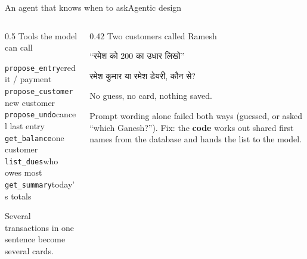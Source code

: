 \documentclass[aspectratio=169,10pt]{beamer}
\newcommand{\lbl}[1]{{\color{muted}\footnotesize #1}}
\begin{document}
\begin{frame}{An agent that knows when to ask}{Agentic design}
  \begin{columns}[T]
    \begin{column}{0.5\textwidth}
      \lbl{Tools the model can call}\par\vspace{4pt}
      \begin{appcard}
        \small
        \texttt{propose\_entry}\hfill{\color{muted}credit / payment}\\
        \texttt{propose\_customer}\hfill{\color{muted}new customer}\\
        \texttt{propose\_undo}\hfill{\color{muted}cancel last entry}\\
        \texttt{get\_balance}\hfill{\color{muted}one customer}\\
        \texttt{list\_dues}\hfill{\color{muted}who owes most}\\
        \texttt{get\_summary}\hfill{\color{muted}today's totals}
      \end{appcard}
      {\footnotesize\color{muted} Several transactions in one sentence become several cards.}
    \end{column}
    \begin{column}{0.42\textwidth}
      \lbl{Two customers called Ramesh}\par\vspace{4pt}
      \begin{appcard}
        {\deva “रमेश को 200 का उधार लिखो”}\par\vspace{6pt}
        {\semibold\deva रमेश कुमार या रमेश डेयरी, कौन से?}\par\vspace{6pt}
        {\footnotesize\color{muted} No guess, no card, nothing saved.}
      \end{appcard}
      \vspace{2pt}
      {\footnotesize Prompt wording alone failed both ways (guessed, or asked “which Ganesh?”). Fix: the \textbf{code} works out shared first names from the database and hands the list to the model.}
    \end{column}
  \end{columns}
\end{frame}
\end{document}
